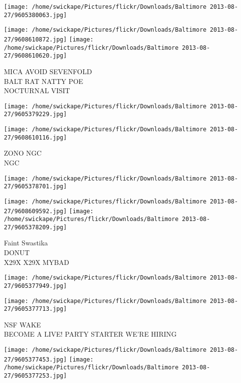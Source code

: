\documentclass[10pt,letterpaper]{article}
\begin{document}
\texttt{[image: /home/swickape/Pictures/flickr/Downloads/Baltimore 2013-08-27/9605380063.jpg]}

\vspace{0.25in}
\texttt{[image: /home/swickape/Pictures/flickr/Downloads/Baltimore 2013-08-27/9608610872.jpg]}
\texttt{[image: /home/swickape/Pictures/flickr/Downloads/Baltimore 2013-08-27/9608610620.jpg]}

MICA AVOID SEVENFOLD\\
BALT RAT NATTY POE\\
NOCTURNAL VISIT\\
\pagebreak

\texttt{[image: /home/swickape/Pictures/flickr/Downloads/Baltimore 2013-08-27/9605379229.jpg]}

\vspace{0.25in}
\texttt{[image: /home/swickape/Pictures/flickr/Downloads/Baltimore 2013-08-27/9608610116.jpg]}

ZONO NGC\\
NGC\\
\pagebreak

\texttt{[image: /home/swickape/Pictures/flickr/Downloads/Baltimore 2013-08-27/9605378701.jpg]}

\vspace{0.25in}
\texttt{[image: /home/swickape/Pictures/flickr/Downloads/Baltimore 2013-08-27/9608609592.jpg]}
\texttt{[image: /home/swickape/Pictures/flickr/Downloads/Baltimore 2013-08-27/9605378209.jpg]}

Faint Swastika\\
DONUT\\
X29X X29X MYBAD\\
\pagebreak

\texttt{[image: /home/swickape/Pictures/flickr/Downloads/Baltimore 2013-08-27/9605377949.jpg]}

\vspace{0.25in}
\texttt{[image: /home/swickape/Pictures/flickr/Downloads/Baltimore 2013-08-27/9605377713.jpg]}

NSF WAKE\\
BECOME A LIVE! PARTY STARTER WE'RE HIRING\\
\pagebreak

\texttt{[image: /home/swickape/Pictures/flickr/Downloads/Baltimore 2013-08-27/9605377453.jpg]}
\texttt{[image: /home/swickape/Pictures/flickr/Downloads/Baltimore 2013-08-27/9605377253.jpg]}
\end{document}
